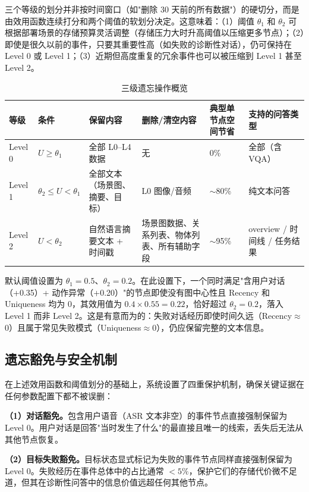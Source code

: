 三个等级的划分并非按时间窗口（如"删除 30 天前的所有数据"）的硬切分，而是由效用函数连续打分和两个阈值的软划分决定。这意味着：（1）阈值 $\theta_1$ 和 $\theta_2$ 可根据部署场景的存储预算灵活调整（存储压力大时升高阈值以压缩更多节点）；（2）即使是很久以前的事件，只要其重要性高（如失败的诊断性对话），仍可保持在 Level 0 或 Level 1；（3）近期但高度重复的冗余事件也可以被压缩到 Level 1 甚至 Level 2。

\begin{table}[htbp]
\centering
\small
\caption{三级遗忘操作概览}
\label{tab:4-1}
\begin{tabular}{p{1.3cm}p{2.0cm}p{2.7cm}p{2.7cm}p{1.5cm}p{1.8cm}}
\toprule
等级 & 条件 & 保留内容 & 删除/清空内容 & 典型单节点空间节省 & 支持的问答类型 \\
\midrule
Level 0 & $U \ge \theta_1$ & 全部 L0–L4 数据 & 无 & 0\% & 全部（含 VQA） \\
Level 1 & $\theta_2 \le U < \theta_1$ & 全部文本（场景图、摘要、目标） & L0 图像/音频 & $\sim$80\% & 纯文本问答 \\
Level 2 & $U < \theta_2$ & 自然语言摘要文本 + 时间戳 & 场景图数据、关系列表、物体列表、所有辅助字段 & $\sim$95\% & overview / 时间线 / 任务结果 \\
\bottomrule
\end{tabular}
\end{table}

默认阈值设置为 $\theta_1=0.5$、$\theta_2=0.2$。在此设置下，一个同时满足"含用户对话（+0.35）+ 动作异常（+0.20）"的节点即使没有图中心性且 Recency 和 Uniqueness 均为 0，其效用值为 $0.4 \times 0.55 = 0.22$，恰好超过 $\theta_2=0.2$，落入 Level 1 而非 Level 2。这是有意而为的：失败对话经历即使时间久远（Recency$\approx$0）且属于常见失败模式（Uniqueness$\approx$0），仍应保留完整的文本信息。

\subsection{遗忘豁免与安全机制}

在上述效用函数和阈值划分的基础上，系统设置了四重保护机制，确保关键证据在任何参数配置下都不被误删：

\textbf{（1）对话豁免。}包含用户语音（ASR 文本非空）的事件节点直接强制保留为 Level 0。用户对话是回答"当时发生了什么"的最直接且唯一的线索，丢失后无法从其他节点恢复。

\textbf{（2）目标失败豁免。}目标状态显式标记为失败的事件节点同样直接强制保留为 Level 0。失败经历在事件总体中的占比通常 $< 5\%$，保护它们的存储代价微不足道，但其在诊断性问答中的信息价值远超任何其他节点。

